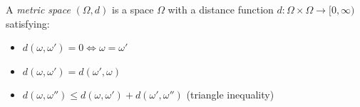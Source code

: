 A \textit{metric space} $(\Omega, d)$ is a space $\Omega$ with a distance function $d: \Omega \times \Omega \to [0, \infty)$ satisfying:
\begin{itemize}
\item $d(\omega, \omega') = 0 \iff \omega = \omega'$
\item $d(\omega, \omega') = d(\omega', \omega)$
\item $d(\omega, \omega'') \leq d(\omega, \omega') + d(\omega', \omega'')$ (triangle inequality)
\end{itemize}
